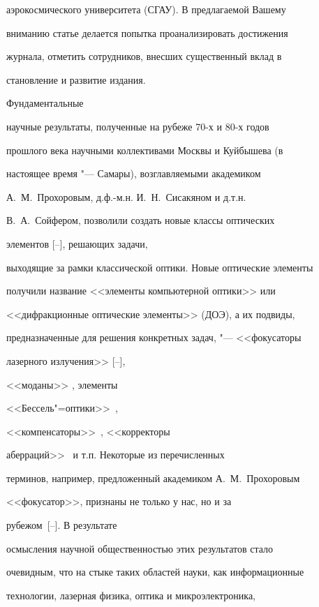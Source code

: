 аэрокосмического университета (СГАУ). В предлагаемой Вашему

вниманию статье делается попытка проанализировать достижения

журнала, отметить сотрудников, внесших существенный вклад в

становление и развитие издания.



\smallskip



 Фундаментальные

научные результаты, полученные на рубеже 70-х и 80-х годов

прошлого века научными коллективами Москвы и Куйбышева (в

настоящее время "--- Самары), возглавляемыми академиком

А.~М.~Прохоровым, д.ф.-м.н. И.~Н.~Сисакяном и д.т.н.

В.~А.~Сойфером, позволили создать новые классы оптических

элементов [--], решающих задачи,

выходящие за рамки классической оптики. Новые оптические элементы

получили название <<элементы компьютерной оптики>> или

<<дифракционные оптические элементы>> (ДОЭ), а их подвиды,

предназначенные для решения конкретных задач, "--- <<фокусаторы

лазерного излучения>> [--],

<<моданы>> \cite{kol:bib6,kol:bib8,kol:bib9}, элементы

<<Бессель"=оптики>>~\cite{kol:bib7},

<<компенсаторы>>~\cite{kol:bib10,kol:bib11}, <<корректоры

аберраций>>~\cite{kol:bib12} и т.п. Некоторые из перечисленных

терминов, например, предложенный академиком А.~М.~Прохоровым

<<фокусатор>>, признаны не только у нас, но и за

рубежом~[--]. В результате

осмысления научной общественностью этих результатов стало

очевидным, что на стыке таких областей науки, как информационные

технологии, лазерная физика, оптика и микроэлектроника,

